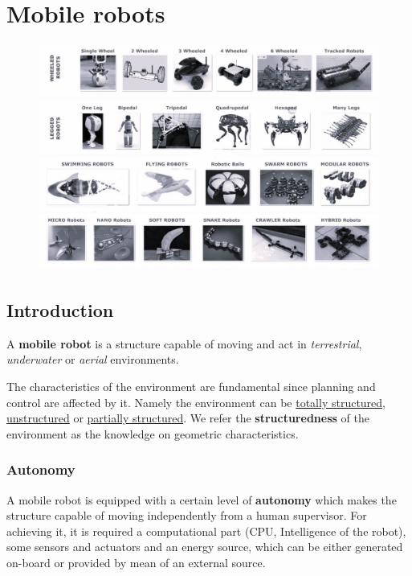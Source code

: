 \chapter{Mobile robots}
\vspace{-0.5cm}
\minitoc

\begin{figure}[h]
    \centering
    \includegraphics[scale=0.4]{img/classification.jpg}
\end{figure}
\vspace{-0.5cm}
\section{Introduction}
\begin{definition}
A \textbf{mobile robot} is a structure capable of moving and act in \textit{terrestrial}, \textit{underwater} or \textit{aerial} environments.    
\end{definition}
\noindent
The characteristics of the environment are fundamental since planning and control are affected by it. Namely the environment can be \underline{totally structured}, \underline{unstructured} or \underline{partially structured}. We refer the \textbf{structuredness} of the environment as the knowledge on geometric characteristics.
\subsection{Autonomy}
A mobile robot is equipped with a certain level of \textbf{autonomy} which makes the structure capable of moving independently from a human supervisor. For achieving it, it is required a computational part (CPU, Intelligence of the robot), some sensors and actuators and an energy source, which can be either generated on-board or provided by mean of an external source.
